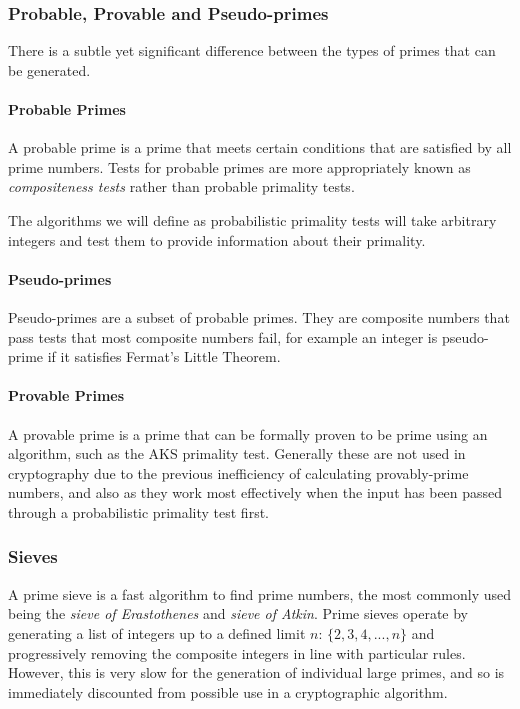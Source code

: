     \subsubsection{Probable, Provable and Pseudo-primes}
    
    There is a subtle yet significant difference between the types of primes that can be generated.
    
      \paragraph{Probable Primes}
      
      A probable prime is a prime that meets certain conditions that are satisfied by all prime numbers. Tests for probable primes are more appropriately known as \emph{compositeness tests} rather than probable primality tests.
      
      The algorithms we will define as probabilistic primality tests will take arbitrary integers and test them to provide information about their primality. 
      
      \paragraph{Pseudo-primes}
      
      Pseudo-primes are a subset of probable primes. They are composite numbers that pass tests that most composite numbers fail, for example an integer is pseudo-prime if it satisfies Fermat's Little Theorem.
      
      \paragraph{Provable Primes}
      
      A provable prime is a prime that can be formally proven to be prime using an algorithm, such as the AKS primality test. Generally these are not used in cryptography due to the previous inefficiency of calculating provably-prime numbers, and also as they work most effectively when the input has been passed through a probabilistic primality test first.
  
    \subsubsection{Sieves}
    
    A prime sieve is a fast algorithm to find prime numbers, the most commonly used being the \emph{sieve of Erastothenes} and \emph{sieve of Atkin}. Prime sieves operate by generating a list of integers up to a defined limit $n$: $\{2,3,4,...,n\}$ and progressively removing the composite integers in line with particular rules. However, this is very slow for the generation of individual large primes, and so is immediately discounted from possible use in a cryptographic algorithm.
    
